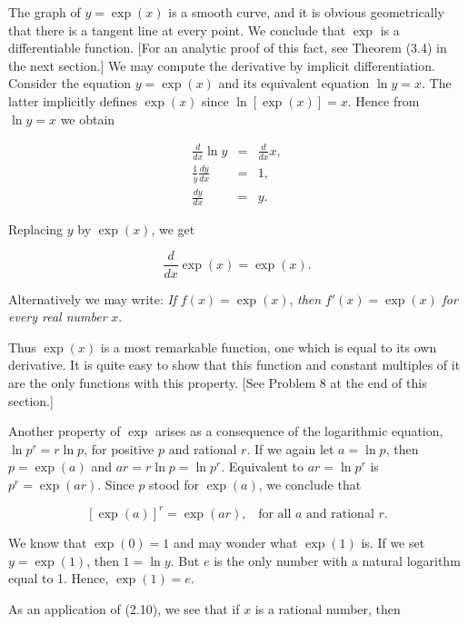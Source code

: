 The graph of $y = \exp(x)$ is a smooth curve, and it is obvious geometrically that there is a tangent line at every point. We conclude that $\exp$ is a differentiable function. [For an analytic proof of this fact, see Theorem (3.4) in the next section.] We may compute the derivative by implicit differentiation. Consider the equation $y = \exp(x)$ and its equivalent equation $\ln y = x$. The latter implicitly defines $\exp(x)$ since $\ln [\exp (x)] = x$. Hence from $\ln y = x$ we obtain

\begin{eqnarray*} 
     \frac{d}{dx} \ln y &=& \frac{d}{dx} x,\\
    \frac{1}{y} \frac{dy}{dx} &=& 1,\\
                \frac{dy}{dx} &=& y.
\end{eqnarray*}

\noindent  Replacing $y$ by $\exp (x)$, we get

\begin{theorem} %
$$
\frac{d}{dx} \exp (x) = \exp (x).
$$
\end{theorem}

\noindent Alternatively we may write: \textit{If} $f(x) = \exp (x)$, \textit{then} $f'(x) = \exp(x)$  \textit{for every real number} $x$.

Thus $\exp (x)$ is a most remarkable function, one which is equal to its own derivative. It is quite easy to show that this function and constant multiples of it are the only functions with this property. [See Problem 8 at the end of this section.]

Another property of $\exp$ arises as a consequence of the logarithmic equation, $\ln p^r = r \ln p$, for positive $p$ and rational $r$. If we again let $a = \ln p$, then $p = \exp (a)$ and $ar= r \ln p = \ln p^r$. Equivalent to $ar = \ln p^r$ is $p^r = \exp (ar)$. Since $p$ stood for $\exp (a)$, we conclude that

\begin{theorem} %
$$
[\exp(a)]^{r} = \exp(ar),  \;\;\; \mbox{for all $a$ and rational $r$}.
$$
\end{theorem}

We know that $\exp(0) = 1$ and may wonder what $\exp(1)$ is. If we set $y = \exp (1)$, then $1 = \ln y$. But $e$ is the only number with a natural logarithm equal to 1. Hence, $\exp(1) = e$.

As an application of (2.10), we see that if $x$ is a rational number, then 

